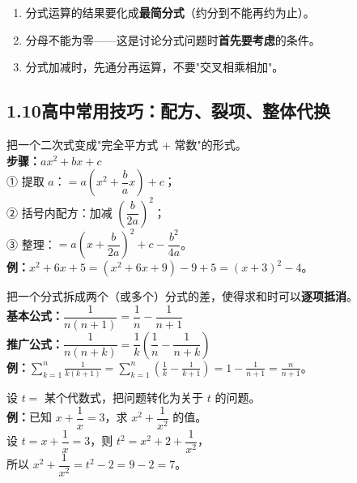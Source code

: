 \documentclass[12pt, a4paper]{ctexart}
\begin{document}
\begin{warnbox}[分式运算注意事项]
\begin{enumerate}[leftmargin=18pt]
\item 分式运算的结果要化成\textbf{最简分式}（约分到不能再约为止）。
\item 分母不能为零——这是讨论分式问题时\textbf{首先要考虑}的条件。
\item 分式加减时，先通分再运算，不要"交叉相乘相加"。
\end{enumerate}
\end{warnbox}

\subsection*{1.10\quad 高中常用技巧：配方、裂项、整体代换}

\begin{knowledgebox}[配方（配方法）]
把一个二次式变成"完全平方式 + 常数"的形式。\\[6pt]
\textbf{步骤：}\quad $ax^2+bx+c$\\[3pt]
① 提取 $a$：$= a\!\left(x^2 + \dfrac{b}{a}x\right) + c$；\\[3pt]
② 括号内配方：加减 $\left(\dfrac{b}{2a}\right)^2$；\\[3pt]
③ 整理：$= a\!\left(x + \dfrac{b}{2a}\right)^2 + c - \dfrac{b^2}{4a}$。\\[6pt]
\textbf{例：}\quad $x^2 + 6x + 5 = (x^2+6x+9) - 9 + 5 = (x+3)^2 - 4$。
\end{knowledgebox}

\begin{knowledgebox}[裂项（裂项相消法）]
把一个分式拆成两个（或多个）分式的差，使得求和时可以\textbf{逐项抵消}。\\[6pt]
\textbf{基本公式：}\quad $\dfrac{1}{n(n+1)} = \dfrac{1}{n} - \dfrac{1}{n+1}$\\[8pt]
\textbf{推广公式：}\quad $\dfrac{1}{n(n+k)} = \dfrac{1}{k}\!\left(\dfrac{1}{n} - \dfrac{1}{n+k}\right)$\\[8pt]
\textbf{例：}\quad $\displaystyle\sum_{k=1}^{n}\frac{1}{k(k+1)} = \sum_{k=1}^{n}\left(\frac{1}{k}-\frac{1}{k+1}\right) = 1 - \frac{1}{n+1} = \frac{n}{n+1}$。
\end{knowledgebox}

\begin{knowledgebox}[整体代换]
设 $t = $ 某个代数式，把问题转化为关于 $t$ 的问题。\\[6pt]
\textbf{例：}\quad 已知 $x + \dfrac{1}{x} = 3$，求 $x^2 + \dfrac{1}{x^2}$ 的值。\\[3pt]
设 $t = x + \dfrac{1}{x} = 3$，则 $t^2 = x^2 + 2 + \dfrac{1}{x^2}$，\\
所以 $x^2 + \dfrac{1}{x^2} = t^2 - 2 = 9 - 2 = 7$。
\end{knowledgebox}
\end{document}
